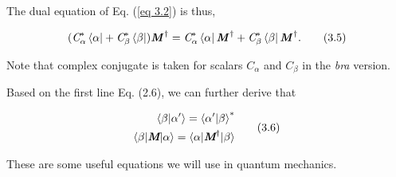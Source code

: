 \documentclass{article}
\begin{document}
The dual equation of Eq. (\ref{eq 3.2}) is thus,

\begin{equation} \label{eq 3.5}
     (\textit{C}_{\alpha}^*\bra{\alpha}+ \textit{C}_{\beta}^*\bra{\beta})\textbf{\textit{M}}^{\dagger}
     =\textit{C}_{\alpha}^* \bra{\alpha}\textbf{\textit{M}}^{\dagger}+\textit{C}_{\beta}^*\bra{\beta}\textbf{\textit{M}}^{\dagger}. \tag{3.5}    
\end{equation}

Note that complex conjugate is taken for scalars $\textit{C}_{\alpha}$ and $\textit{C}_{\beta}$ in the \textit{bra} version.


Based on the first line Eq. (2.6), we can further derive that

\begin{align} \label{eq 3.6}
    \begin{split}
        \braket{\beta|\alpha^\prime}=\braket{\alpha^\prime|\beta}^*\\
\braket{\beta|\textit{\textbf{M}}|\alpha}=\braket{\alpha|\textit{\textbf{M}}^{\dagger}|\beta}
    \end{split}\tag{3.6}
\end{align}


These are some useful equations we will use in quantum mechanics.
\end{document}
